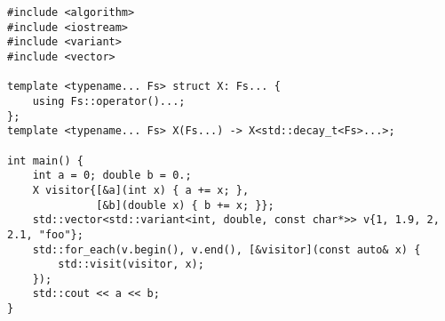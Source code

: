 \begin{lstlisting}[title=\href{https://godbolt.org/z/9fv85o}{\texttt{godbolt.org/z/9fv85o}}]
#include <algorithm>
#include <iostream>
#include <variant>
#include <vector>

template <typename... Fs> struct X: Fs... {
    using Fs::operator()...;
};
template <typename... Fs> X(Fs...) -> X<std::decay_t<Fs>...>;

int main() {
    int a = 0; double b = 0.;
    X visitor{[&a](int x) { a += x; },
              [&b](double x) { b += x; }};
    std::vector<std::variant<int, double, const char*>> v{1, 1.9, 2, 2.1, "foo"};
    std::for_each(v.begin(), v.end(), [&visitor](const auto& x) {
        std::visit(visitor, x);
    });
    std::cout << a << b;
}
\end{lstlisting}
